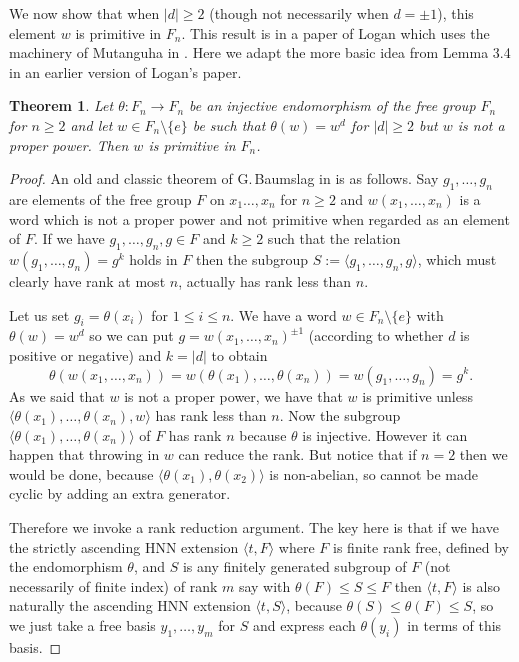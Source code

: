 \documentclass[11pt,reqno]{amsart}
\numberwithin{equation}{section}
\newcommand{\leqs}{\leqslant}
\newcommand{\geqs}{\geqslant}
\newtheorem{thm}{Theorem}[section]
\theoremstyle{definition}
\theoremstyle{remark}
\begin{document}
  We now show that when $|d|\geq 2$ (though not necessarily when $d=\pm 1$),
  this element $w$ is primitive in $F_n$. This result is in a paper \cite{lgv4}
  of Logan which uses the machinery of Mutanguha in \cite{mut}. Here we
  adapt the more basic idea from Lemma 3.4 in an earlier version \cite{lgv3}
  of Logan's paper.
  \begin{thm} \label{melg}
    Let $\theta: F_n\rightarrow F_n$ be an injective endomorphism of the free
    group $F_n$ for $n\geqs 2$ and let $w\in F_n\setminus\{e\}$ be such
    that $\theta(w)=w^d$ for $|d|\geqs 2$ but $w$ is not a proper power.
    Then $w$ is primitive in $F_n$.
  \end{thm}
  \begin{proof}
    An old and classic theorem of G.\,Baumslag in \cite{bmrn} is as follows.
    Say $g_1,\ldots ,g_n$ are elements of the free group $F$ on
    $x_1\ldots ,x_n$ for $n\geqs 2$
    and $w(x_1,\ldots ,x_n)$ is a word which is not a proper power and not
    primitive when regarded as an element of $F$.
    If we have $g_1,\ldots ,g_n,g\in F$ and
    $k\geq 2$ such that the relation $w(g_1,\ldots ,g_n)=g^k$ holds in $F$
    then the subgroup $S:=\langle g_1,\ldots ,g_n,g\rangle$, which must
    clearly have rank at most $n$, actually has rank less than $n$.

    Let us set $g_i=\theta(x_i)$ for $1\leqs i\leqs n$.
    We have a word $w\in F_n\setminus\{e\}$ with $\theta(w)=w^d$ so we can
    put $g=w(x_1,\ldots ,x_n)^{\pm 1}$ (according to whether $d$ is positive
    or negative) and $k=|d|$ to obtain
    \[\theta(w(x_1,\ldots ,x_n))=w(\theta(x_1),\ldots ,\theta(x_n))
      =w(g_1,\ldots ,g_n)=g^k.\]
    As we said that $w$ is not a proper power, we have that $w$ is primitive
    unless
    $\langle \theta(x_1),\ldots ,\theta(x_n),w\rangle$ has rank less than $n$.
    Now the subgroup $\langle \theta(x_1),\ldots ,\theta(x_n)\rangle$ of $F$ has
    rank $n$ because $\theta$ is injective. However it can happen that 
    throwing in $w$ can reduce the rank. But notice that if $n=2$
    then we would be done, because  $\langle \theta(x_1),\theta(x_2)\rangle$
    is non-abelian, so cannot be made cyclic by adding an extra generator.

    Therefore we invoke a rank reduction argument. The key here is that
    if we have the strictly ascending HNN extension $\langle t,F\rangle$
    where $F$ is finite rank free, defined by the endomorphism $\theta$,
    and $S$ is any finitely generated subgroup of $F$ (not necessarily
    of finite index) of rank $m$ say
    with $\theta(F)\leqs S\leqs F$ then
    $\langle t,F\rangle$ is also naturally the ascending HNN extension
    $\langle t,S \rangle$, because $\theta(S)\leqs \theta(F)\leqs S$, so
    we just take a free basis $y_1,\ldots ,y_m$ for $S$ and express each
    $\theta(y_i)$ in terms of this basis.


\end{proof}
\end{document}
